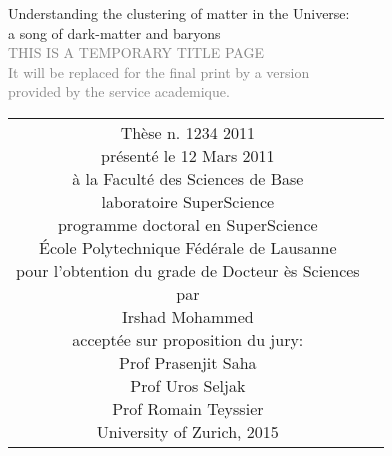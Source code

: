 \begin{titlepage}
\begin{center}
\sffamily


\null\vspace{2cm}
{\huge  Understanding the clustering of matter in the Universe: \\[12pt] a song of dark-matter and baryons}  \\[24pt] 
\textcolor{gray}{\small{THIS IS A TEMPORARY TITLE PAGE \\ It will be replaced for the final print by a version \\ provided by the service academique.}}
    
\vfill

\begin{tabular} {cc}

\parbox{0.7\textwidth}{%
	Thèse n. 1234 2011\\
	présenté le 12 Mars 2011\\
	à la Faculté des Sciences de Base\\
	laboratoire SuperScience\\
	programme doctoral en SuperScience\\
%
	École Polytechnique Fédérale de Lausanne\\[6pt]
	pour l'obtention du grade de Docteur ès Sciences\\
	par\\ [4pt]
	\null \hspace{3em} Irshad Mohammed\\[9pt]
%
\small
acceptée sur proposition du jury:\\[4pt]
%
    Prof Prasenjit Saha\\
    Prof Uros Seljak\\
    Prof Romain Teyssier\\[12pt]
%
University of Zurich, 2015}
\end{tabular}
\end{center}
\vspace{2cm}
\end{titlepage}



